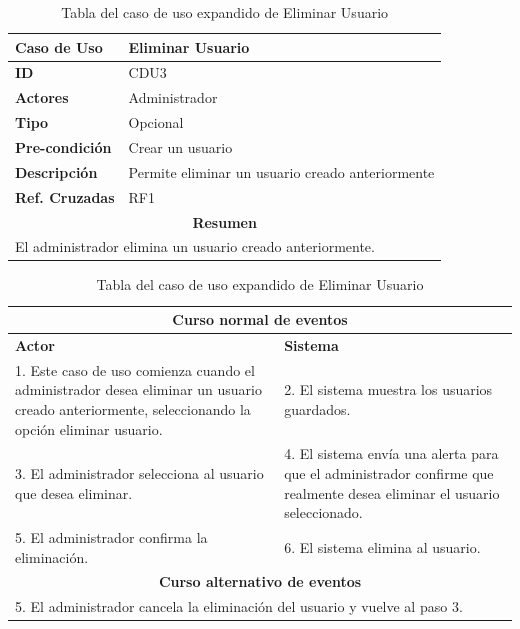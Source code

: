 \newpage
\clearpage
\clearpage
\begin{table}
	\centering
	\begin{tabular}{|p{6cm} |p{6cm}|}
		\hline \textbf{Caso de Uso} & Eliminar Usuario \\ 
		\hline \textbf{ID} & CDU3 \\ 
		\hline \textbf{Actores} & Administrador \\ 
		\hline \textbf{Tipo} & Opcional \\ 
		\hline \textbf{Pre-condición} & Crear un usuario \\ 
		\hline \textbf{Descripción} & Permite eliminar un usuario creado anteriormente \\
		\hline \textbf{Ref. Cruzadas} & RF1 \\ 
		\hline
		\multicolumn{2}{|c|}{\textbf{Resumen}} \\
		\hline
		\multicolumn{2}{|p{12cm}|}{El administrador elimina un usuario creado anteriormente.} \\
		\hline 
	\end{tabular}  
	\begin{tabular}{|p{6cm}|p{6cm}|}
		\multicolumn{2}{|c|}{\textbf{Curso normal de eventos}} \\
		\hline \textbf{Actor} & \textbf{Sistema} \\ 
		\hline 1. Este caso de uso comienza cuando el administrador desea eliminar un usuario creado anteriormente, seleccionando la opción eliminar usuario. & 2. El sistema muestra los usuarios guardados. \\ 
		3. El administrador selecciona al usuario que desea eliminar. & 4. El sistema envía una alerta para que el administrador confirme que realmente desea eliminar el usuario seleccionado.  \\
		5. El administrador confirma la eliminación. & 6. El sistema elimina al usuario. \\
		\hline
		\multicolumn{2}{|c|}{\textbf{Curso alternativo de eventos}} \\
		\hline
		\multicolumn{2}{|p{12cm}|}{5. El administrador cancela la eliminación del usuario y vuelve al paso 3. } \\
		\hline
	\end{tabular}
	\caption{Tabla del caso de uso expandido de Eliminar Usuario}
	\label{tabcdu3}
\end{table}

\newpage
\clearpage

